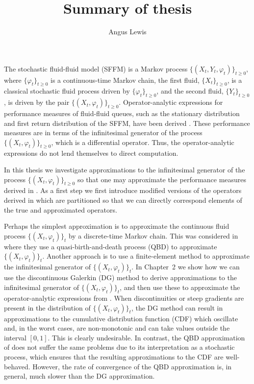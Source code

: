 \documentclass[a4paper]{article}
\title{Summary of thesis}
\author{Angus Lewis}
\begin{document}
\maketitle
The stochastic fluid-fluid model (SFFM) is a Markov process {\(\{(X_t,Y_t,\varphi_t)\}_{t\geq 0}\),} where {\(\{\varphi_t\}_{t\geq 0}\)} is a continuous-time Markov chain, the first fluid, {\(\{X_t\}_{t\geq 0}\),} is a classical stochastic fluid process driven by {\(\{\varphi_t\}_{t\geq0}\),} and the second fluid, {\(\{Y_t\}_{t\geq0}\),} is driven by the pair {\(\{(X_t,\varphi_t)\}_{t\geq 0}\).} Operator-analytic expressions for performance measures of fluid-fluid queues, such as the stationary distribution and first return distribution of the SFFM, have been derived \cite{bo2014}. These performance measures are in terms of the infinitesimal generator of the process {\(\{(X_t,\varphi_t)\}_{t\geq 0}\)}, which is a differential operator. Thus, the operator-analytic expressions do not lend themselves to direct computation. 

In this thesis we investigate approximations to the infinitesimal generator of the process {\(\{(X_t,\varphi_t)\}_{t\geq 0}\)} so that one may approximate the performance measures derived in \cite{bo2014}. As a first step we first introduce modified versions of the operators derived in \cite{bo2014} which are partitioned so that we can directly correspond elements of the true and approximated operators.

Perhaps the simplest approximation is to approximate the continuous fluid process \(\{(X_t,\varphi_t)\}_t\) by a discrete-time Markov chain. This was considered in \cite{bo2013} where they use a quasi-birth-and-death process (QBD) to approximate \(\{(X_t,\varphi_t)\}_t\). Another approach is to use a finite-element method to approximate the infinitesimal generator of \(\{(X_t,\varphi_t)\}_t\). In Chapter~2 we show how we can use the discontinuous Galerkin (DG) method to derive approximations to the infinitesimal generator of \(\{(X_t,\varphi_t)\}_t\), and then use these to approximate the operator-analytic expressions from \cite{bo2014}. When discontinuities or steep gradients are present in the distribution of \(\{(X_t,\varphi_t)\}_t\), the DG method can result in approximations to the cumulative distribution function (CDF) which oscillate and, in the worst cases, are non-monotonic and can take values outside the interval \([0,1]\). This is clearly undesirable. In contrast, the QBD approximation of \cite{bo2013} does not suffer the same problems due to its interpretation as a stochastic process, which ensures that the resulting approximations to the CDF are well-behaved. However, the rate of convergence of the QBD approximation is, in general, much slower than the DG approximation.
\end{document}
